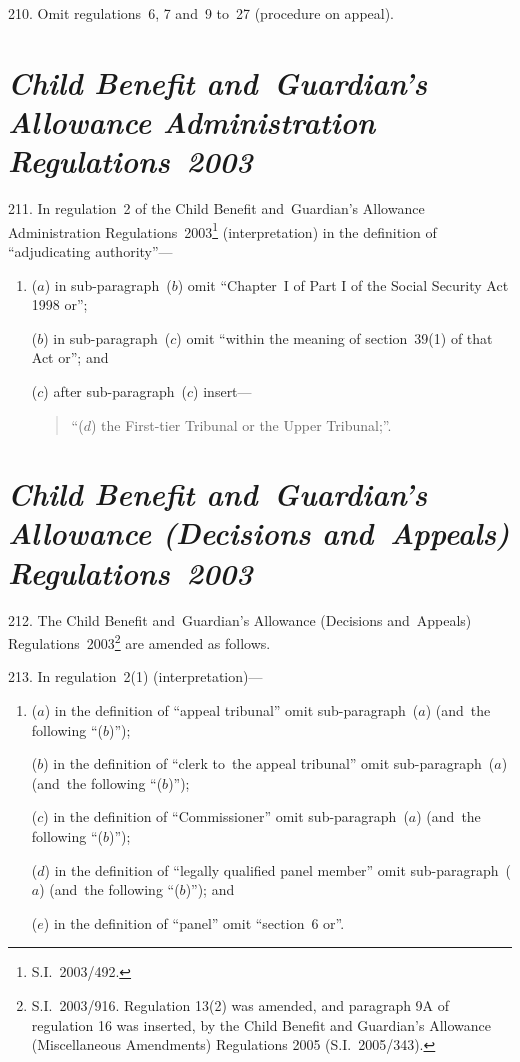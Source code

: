\documentclass[12pt,a4paper]{article}
\begin{document}
\medskip

210.  Omit regulations~6, 7 and~9 to~27 (procedure on appeal).

\section*{\itshape Child Benefit and~Guardian’s Allowance Administration Regulations~2003}

211.  In regulation~2 of the Child Benefit and~Guardian’s Allowance Administration Regulations~2003\footnote{S.I.~2003/492.} (interpretation) in the definition of “adjudicating authority”—
\begin{enumerate}\item[]
($a$) in sub-paragraph~($b$)  omit “Chapter~I of Part I of the Social Security Act 1998 or”;

($b$) in sub-paragraph~($c$)  omit “within the meaning of section~39(1) of that Act or”; and

($c$) after sub-paragraph~($c$)  insert—
\begin{quotation}
“($d$) the First-tier Tribunal or the Upper Tribunal;”.
\end{quotation}
\end{enumerate}

\section*{\itshape Child Benefit and~Guardian’s Allowance (Decisions and~Appeals) Regulations~2003}

212.  The Child Benefit and~Guardian’s Allowance (Decisions and~Appeals) Regulations~2003\footnote{S.I.~2003/916. Regulation 13(2) was amended, and paragraph 9A of regulation 16 was inserted, by the Child Benefit and Guardian’s Allowance (Miscellaneous Amendments) Regulations 2005 (S.I.~2005/343).} are amended as follows.

\medskip

213.  In regulation~2(1) (interpretation)—
\begin{enumerate}\item[]
($a$) in the definition of “appeal tribunal” omit sub-paragraph~($a$)  (and~the following “($b$)”);

($b$) in the definition of “clerk to~the appeal tribunal” omit sub-paragraph~($a$)  (and~the following “($b$)”);

($c$) in the definition of “Commissioner” omit sub-paragraph~($a$)  (and~the following “($b$)”);

($d$) in the definition of “legally qualified panel member” omit sub-\hspace{0pt}paragraph~($a$)  (and~the following “($b$)”); and

($e$) in the definition of “panel” omit “section~6 or”.
\end{enumerate}
\end{document}
